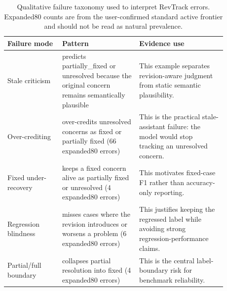 \begin{table}[t]
\centering
\scriptsize
\setlength{\tabcolsep}{3pt}
\begin{tabular}{p{0.22\linewidth}p{0.31\linewidth}p{0.35\linewidth}}
\toprule
Failure mode & Pattern & Evidence use \\
\midrule
Stale criticism & predicts partially\_fixed or unresolved because the original concern remains semantically plausible & This example separates revision-aware judgment from static semantic plausibility. \\
Over-crediting & over-credits unresolved concerns as fixed or partially fixed (66 expanded80 errors) & This is the practical stale-assistant failure: the model would stop tracking an unresolved concern. \\
Fixed under-recovery & keeps a fixed concern alive as partially fixed or unresolved (4 expanded80 errors) & This motivates fixed-case F1 rather than accuracy-only reporting. \\
Regression blindness & misses cases where the revision introduces or worsens a problem (6 expanded80 errors) & This justifies keeping the regressed label while avoiding strong regression-performance claims. \\
Partial/full boundary & collapses partial resolution into fixed (4 expanded80 errors) & This is the central label-boundary risk for benchmark reliability. \\
\bottomrule
\end{tabular}
\caption{Qualitative failure taxonomy used to interpret RevTrack errors. Expanded80 counts are from the user-confirmed standard active frontier and should not be read as natural prevalence.}
\label{tab:failure-taxonomy}
\end{table}
